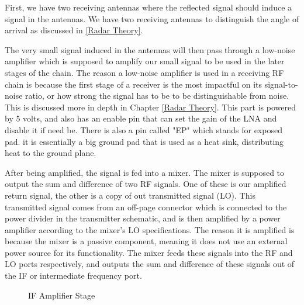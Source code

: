 First, we have two receiving antennas where the reflected signal should induce a signal in the antennas. We have two
receiving antennas to distinguish the angle of arrival as discussed in \ref{Radar Theory}.

The very small signal induced in the antennas will then pass through a low-noise amplifier which is supposed to amplify our small
signal to be used in the later stages of the chain. The reason a low-noise amplifier is used in a receiving RF chain is because
the first stage of a receiver is the most impactful on its signal-to-noise ratio, or how strong the signal has to be to be
distinguishable from noise. This is discussed more in depth in Chapter \ref{Radar Theory}. This part is powered by 5 volts, and
also has an enable pin that can set the gain of the LNA and disable it if need be. There is also a pin called "EP" which stands
for exposed pad. it is essentially a big ground pad that is used as a heat sink, distributing heat to the ground plane.

After being amplified, the signal is fed into a mixer. The mixer is supposed to output the sum and difference of two RF signals.
One of these is our amplified return signal, the other is a copy of out transmitted signal (LO). This transmitted signal comes from
an off-page connector which is connected to the power divider in the transmitter schematic, and is then amplified by a power
amplifier according to the mixer's LO specifications. The reason it is amplified is because the mixer is a passive
component, meaning it does not use an external power source for its functionality.
The mixer feeds these signals into the RF and LO ports respectively, and
outputs the sum and difference of these signals out of the IF or intermediate frequency port.

\begin{figure}[H]
  \centering
\caption{IF Amplifier Stage}
\label{img:ifamplifier}
\end{figure}

